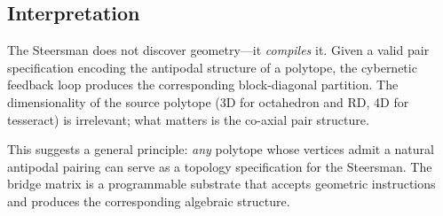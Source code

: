 \subsection{Interpretation}

The Steersman does not discover geometry---it \emph{compiles} it. Given a
valid pair specification encoding the antipodal structure of a polytope, the
cybernetic feedback loop produces the corresponding block-diagonal partition.
The dimensionality of the source polytope (3D for octahedron and RD, 4D for
tesseract) is irrelevant; what matters is the co-axial pair structure.

This suggests a general principle: \emph{any} polytope whose vertices admit
a natural antipodal pairing can serve as a topology specification for the
Steersman. The bridge matrix is a programmable substrate that accepts
geometric instructions and produces the corresponding algebraic structure.
